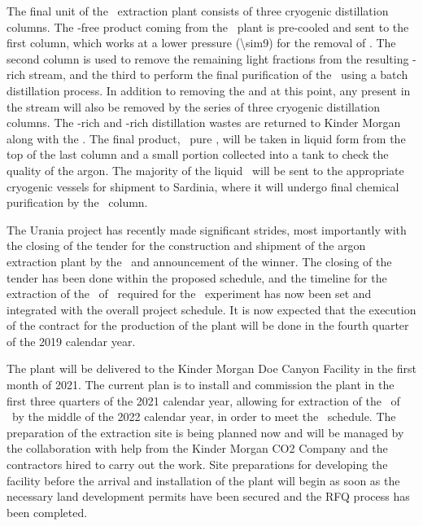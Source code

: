 The final unit of the \UAr\ extraction plant consists of three cryogenic distillation columns.  The -free product coming from the \PSA\ plant is pre-cooled and sent to the first column, which works at a lower pressure (\SI{\sim9}{\barg}) for the removal of .  The second column is used to remove the remaining light fractions from the resulting -rich stream, and the third to perform the final purification of the \UAr\ using a batch distillation process.  In addition to removing the  and  at this point, any  present in the stream will also be removed by the series of three cryogenic distillation columns.  The -rich and -rich distillation wastes are returned to Kinder Morgan along with the .  The final product, \UraniaArFinalPurity\ pure \UAr, will be taken in liquid form from the top of the last column and a small portion collected into a tank to check the quality of the argon.  The majority of the liquid \UAr\ will be sent to the appropriate cryogenic vessels for shipment to Sardinia, where it will undergo final chemical purification by the \SeruciOne\ column.

The Urania project has recently made significant strides, most importantly with the closing of the tender for the construction and shipment of the argon extraction plant by the \INFN\ and announcement of the winner.  The closing of the tender has been done within the proposed schedule, and the timeline for the extraction of the \UraniaTotalDSkProduction\ of \UAr\ required for the \DSks\ experiment has now been set and integrated with the overall project schedule.  It is now expected that the execution of the contract for the production of the plant will be done in the fourth quarter of the 2019 calendar year.  

The plant will be delivered to the Kinder Morgan Doe Canyon Facility in the first month of 2021. The current plan is to install and commission the plant in the first three quarters of the 2021 calendar year, allowing for extraction of the \UraniaTotalDSkProduction\ of \UAr\ by the middle of the 2022 calendar year, in order to meet the \DSk\ schedule. The preparation of the extraction site is being planned now and will be managed by the collaboration with help from the Kinder Morgan CO2 Company and the contractors hired to carry out the work. Site preparations for developing the facility before the arrival and installation of the plant will begin as soon as the necessary land development permits have been secured and the RFQ process has been completed. 

